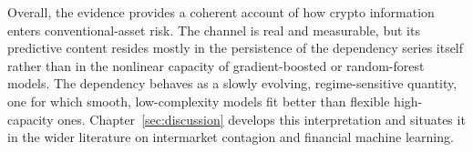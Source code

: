 Overall, the evidence provides a coherent account of how crypto information enters conventional-asset risk. The channel is real and measurable, but its predictive content resides mostly in the persistence of the dependency series itself rather than in the nonlinear capacity of gradient-boosted or random-forest models. The dependency behaves as a slowly evolving, regime-sensitive quantity, one for which smooth, low-complexity models fit better than flexible high-capacity ones. Chapter~\ref{sec:discussion} develops this interpretation and situates it in the wider literature on intermarket contagion and financial machine learning.
